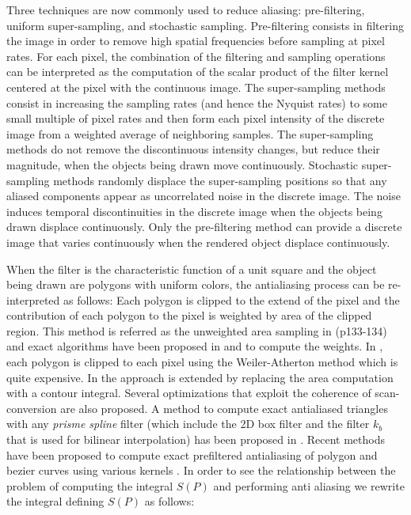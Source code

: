 \documentclass[11pt]{article}
\begin{document}
 Three techniques are now commonly used to reduce aliasing: pre-filtering, uniform super-sampling, and stochastic sampling. Pre-filtering consists in filtering the image in order to remove high spatial frequencies before sampling at pixel rates. For each pixel, the combination of the filtering and sampling operations can be interpreted as the computation of the scalar product of the filter kernel centered at the pixel with the continuous image.  
 The super-sampling methods consist in increasing the sampling rates (and hence the Nyquist rates) to some small multiple of pixel rates and then form each pixel intensity of the discrete image from a weighted average of neighboring samples. The super-sampling methods do not remove the discontinuous intensity changes, but reduce their magnitude, when the objects being drawn move continuously. Stochastic super-sampling methods randomly displace the super-sampling positions so that any aliased components appear as uncorrelated noise in the discrete image. 
 The noise induces temporal discontinuities in the discrete image when the objects being drawn displace continuously. Only the pre-filtering method can provide a discrete image that varies continuously when the rendered object displace continuously. 
 
 When the filter is the characteristic function of a unit square and the object being drawn are polygons with uniform colors, the antialiasing process can be re-interpreted as follows: 
Each polygon is clipped to the extend of the pixel and the contribution of each polygon to the pixel is weighted by area of the clipped region. This method is referred as the unweighted area sampling in \cite{Foley1996}(p133-134) and exact algorithms have been proposed in \cite{Catmull1978} and \cite{Duff1989} to compute the weights. In \cite{Catmull1978}, each polygon is clipped to each pixel using the Weiler-Atherton method which is quite expensive. In \cite{Duff1989} the approach is extended by replacing the area computation with a contour integral. Several optimizations that exploit the coherence of scan-conversion are also proposed. 
A method to compute exact antialiased triangles with any \emph{prisme spline} filter (which include the 2D box filter and the filter $k_b$ that is used for bilinear interpolation) has been proposed in \cite{McCool1995}.
Recent methods have been proposed to compute exact prefiltered antialiasing of polygon and bezier curves using various kernels \cite{Auzinger2015,Manson2013}.
In order to see the relationship between the problem of computing the integral $S(P)$ and performing anti aliasing we rewrite the integral defining $S(P)$ as follows:
\end{document}
